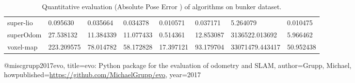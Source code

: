 \begin{table}[]
{\begin{tabular}{llllllll}
		super-lio & 0.095630 & 0.035664 & 0.034378 & 0.010571 & 0.037171 & 5.264079 & 0.010475 \\
		superOdom & 27.538132 & 11.384339 & 11.077433 & 0.514361 & 12.853087 & 3136522.013692 & 5.966462 \\
		voxel-map & 223.209575 & 78.014782 & 58.172828 & 17.397121 & 93.179704 & 33071479.443417 & 50.952438 \\
        	\end{tabular}%
        }
        	\caption{Quantitative evaluation (Absolute Pose Error \cite{grupp2017evo}) of algorithms on bunker dataset.}
        	\label{table3}
\end{table}

@misc{grupp2017evo,
  title={evo: Python package for the evaluation of odometry and SLAM},
  author={Grupp, Michael},
  howpublished={\url{https://github.com/MichaelGrupp/evo}},
  year={2017}
}
